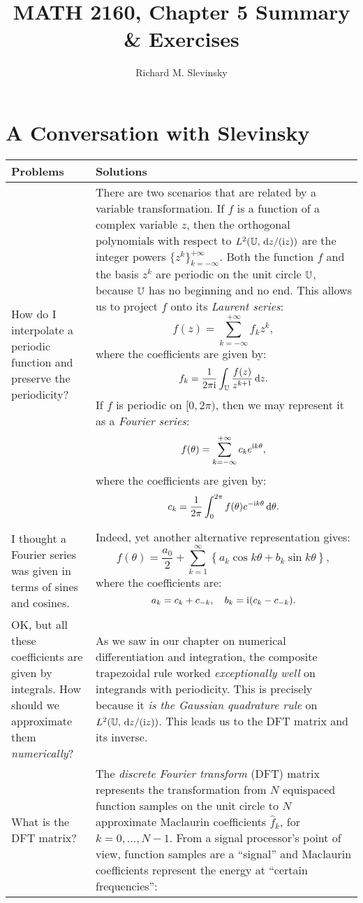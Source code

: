 \documentclass[11pt,letterpaper]{article}
\begin{document}
\title{MATH 2160, Chapter 5 Summary \& Exercises}
\author{Richard M. Slevinsky}
\date{}
\maketitle

\section*{A Conversation with Slevinsky}

\begin{longtable}{p{}|p{}}
\hline
Problems & Solutions\\
\hline
How do I interpolate a periodic function and preserve the periodicity? & There are two scenarios that are related by a variable transformation. If $f$ is a function of a complex variable $z$, then the orthogonal polynomials with respect to $L^2(\mathbb{U},{\rm\,d} z/({\rm i} z))$ are the integer powers $\{z^k\}_{k=-\infty}^{+\infty}$. Both the function $f$ and the basis $z^k$ are periodic on the unit circle $\mathbb{U}$, because $\mathbb{U}$ has no beginning and no end. This allows us to project $f$ onto its {\em Laurent series}:
\[
f(z) = \sum_{k=-\infty}^{+\infty} f_k z^k,
\]
where the coefficients are given by:
\[
f_k = \dfrac{1}{2\pi{\rm i}}\int_{\mathbb{U}} \dfrac{f(z)}{z^{k+1}}{\rm\,d} z.
\]
If $f$ is periodic on $[0,2\pi)$, then we may represent it as a {\em Fourier series}:
\[
f(\theta) = \sum_{k=-\infty}^{+\infty} c_k e^{{\rm i} k\theta},
\]
where the coefficients are given by:
\[
c_k = \dfrac{1}{2\pi}\int_0^{2\pi} f(\theta) e^{-{\rm i} k\theta}{\rm\,d}\theta.
\]\\
I thought a Fourier series was given in terms of sines and cosines. & Indeed, yet another alternative representation gives:
\[
f(\theta) = \dfrac{a_0}{2} + \sum_{k=1}^\infty \left\{ a_k\cos k\theta + b_k\sin k\theta\right\},
\]
where the coefficients are:
\[
a_k = c_k+c_{-k},\quad b_k = {\rm i}(c_k-c_{-k}).
\]
\\
\hline
OK, but all these coefficients are given by integrals. How should we approximate them {\em numerically}? & As we saw in our chapter on numerical differentiation and integration, the composite trapezoidal rule worked {\em exceptionally well} on integrands with periodicity. This is precisely because it {\em is the Gaussian quadrature rule} on $L^2(\mathbb{U},{\rm\,d} z/({\rm i} z))$. This leads us to the DFT matrix and its inverse.\\
\hline
What is the DFT matrix? & The {\em discrete Fourier transform} (DFT) matrix represents the transformation from $N$ equispaced function samples on the unit circle to $N$ approximate Maclaurin coefficients $\hat{f}_k$, for $k=0,\ldots,N-1$. From a signal processor's point of view, function samples are a ``signal'' and Maclaurin coefficients represent the energy at ``certain frequencies'':

\end{longtable}
\end{document}
